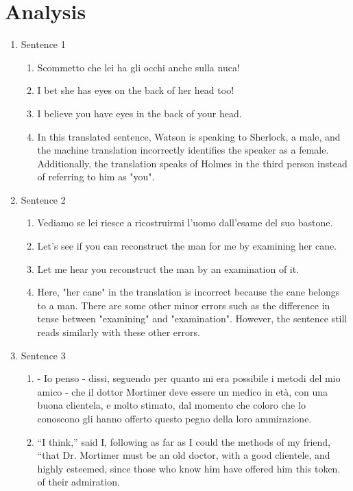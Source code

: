 \documentclass{article}
\begin{document}
\section{Analysis}
\begin{enumerate}
    \item Sentence 1
    \begin{enumerate}[label=(\alph*)]
        \item Scommetto che lei ha gli occhi anche sulla nuca! 
        \item I bet she has eyes on the back of her head too!
        \item I believe you have eyes in the back of your head. 
        \item In this translated sentence, Watson is speaking to Sherlock, a male, and the 
        machine translation incorrectly identifies the speaker as a female. Additionally, 
        the translation speaks of Holmes in the third person instead of referring to him as "you".
    \end{enumerate}
    \item Sentence 2
    \begin{enumerate}[label=(\alph*)]
        \item Vediamo se lei riesce a ricostruirmi l'uomo dall'esame del suo bastone.
        \item Let's see if you can reconstruct the man for me by examining her cane.
        \item Let me hear you reconstruct the man by an examination of it.
        \item Here, "her cane" in the translation is incorrect because the cane belongs to
        a man. There are some other minor errors such as the difference in tense between "examining"
        and "examination". However, the sentence still reads similarly with these other errors.
    \end{enumerate}
    \item Sentence 3
    \begin{enumerate}[label=(\alph*)]
        \item    - Io penso - dissi, seguendo per quanto mi era possibile i metodi del mio amico - che il dottor Mortimer deve essere un medico in età, con una buona clientela, e molto stimato, dal momento che coloro che lo conoscono gli hanno offerto questo pegno della loro ammirazione.
        \item “I think,” said I, following as far as I could the methods of my friend, “that Dr. Mortimer must be an old doctor, with a good clientele, and highly esteemed, since those who know him have offered him this token. of their admiration.

\end{enumerate}
\end{enumerate}
\end{document}
